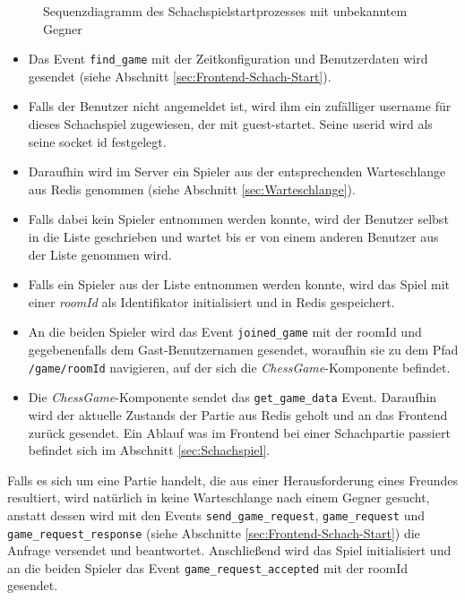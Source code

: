 \begin{figure}[!htbp]
\begin{adjustbox}{height=\textheight}
\begin{sequencediagram}
    
    
  \end{sequencediagram}
  \end{adjustbox}
  
  \caption{Sequenzdiagramm des Schachspielstartprozesses mit unbekanntem Gegner}
  \label{fig:sequence_chess_start}
\end{figure}


\begin{itemize}
\item Das Event \verb|find_game| mit der Zeitkonfiguration und Benutzerdaten wird gesendet (siehe Abschnitt \ref{sec:Frontend-Schach-Start}).
\item Falls der Benutzer nicht angemeldet ist, wird ihm  ein zufälliger username für dieses Schachspiel zugewiesen, der mit \glqq guest-\grqq{ }startet. Seine userid wird als seine socket id festgelegt.
\item Daraufhin wird im Server ein Spieler aus der entsprechenden Warteschlange aus Redis genommen (siehe Abschnitt \ref{sec:Warteschlange}).
\item Falls dabei kein Spieler entnommen werden konnte, wird der Benutzer selbst in die Liste geschrieben und wartet bis er von einem anderen Benutzer aus der Liste genommen wird.
\item Falls ein Spieler aus der Liste entnommen werden konnte, wird das Spiel mit einer \textit{roomId} als Identifikator initialisiert und in Redis gespeichert.
\item An die beiden Spieler wird das Event \verb|joined_game| mit der roomId und gegebenenfalls dem Gast-Benutzernamen gesendet, woraufhin sie zu dem Pfad \verb|/game/roomId| navigieren, auf der sich die \textit{ChessGame}-Komponente befindet.
\item Die \textit{ChessGame}-Komponente sendet das \verb|get_game_data| Event. Daraufhin wird der aktuelle Zustands der Partie aus Redis geholt und an das Frontend zurück gesendet. Ein Ablauf was im Frontend bei einer Schachpartie passiert befindet sich im Abschnitt \ref{sec:Schachspiel}.
\end{itemize}

Falls es sich um eine Partie handelt, die aus einer Herausforderung eines Freundes resultiert, wird natürlich in keine Warteschlange nach einem Gegner gesucht, anstatt dessen wird mit den Events \verb|send_game_request|, \verb|game_request| und \verb|game_request_response| (siehe Abschnitte \ref{sec:Frontend-Schach-Start}) die Anfrage versendet und beantwortet. Anschließend wird das Spiel initialisiert und an die beiden Spieler das Event \verb|game_request_accepted| mit der roomId gesendet.

